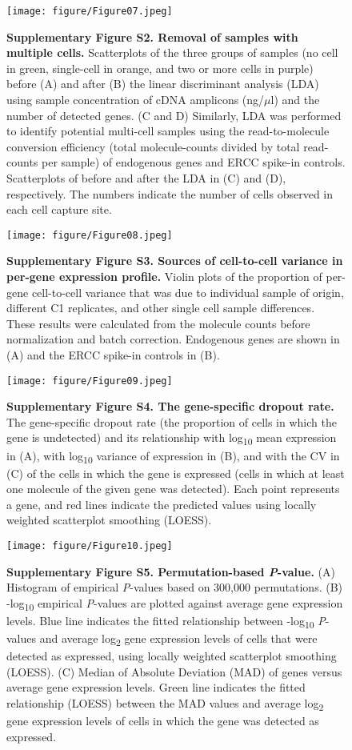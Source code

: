 \begin{figure}[htbp]
\centering
\texttt{[image: figure/Figure07.jpeg]}
\caption{\textbf{Supplementary Figure S2. Removal of samples with
multiple cells.} Scatterplots of the three groups of samples (no cell in
green, single-cell in orange, and two or more cells in purple) before
(A) and after (B) the linear discriminant analysis (LDA) using sample
concentration of cDNA amplicons (ng/$\mu$l) and the number of detected
genes. (C and D) Similarly, LDA was performed to identify potential
multi-cell samples using the read-to-molecule conversion efficiency
(total molecule-counts divided by total read-counts per sample) of
endogenous genes and ERCC spike-in controls. Scatterplots of before and
after the LDA in (C) and (D), respectively. The numbers indicate the
number of cells observed in each cell capture site.}
\end{figure}

\begin{figure}[htbp]
\centering
\texttt{[image: figure/Figure08.jpeg]}
\caption{\textbf{Supplementary Figure S3. Sources of cell-to-cell
variance in per-gene expression profile.} Violin plots of the proportion
of per-gene cell-to-cell variance that was due to individual sample of
origin, different C1 replicates, and other single cell sample
differences. These results were calculated from the molecule counts
before normalization and batch correction. Endogenous genes are shown in
(A) and the ERCC spike-in controls in (B).}
\end{figure}

\begin{figure}[htbp]
\centering
\texttt{[image: figure/Figure09.jpeg]}
\caption{\textbf{Supplementary Figure S4. The gene-specific dropout
rate.} The gene-specific dropout rate (the proportion of cells in which
the gene is undetected) and its relationship with log\textsubscript{10}
mean expression in (A), with log\textsubscript{10} variance of
expression in (B), and with the CV in (C) of the cells in which the gene
is expressed (cells in which at least one molecule of the given gene was
detected). Each point represents a gene, and red lines indicate the
predicted values using locally weighted scatterplot smoothing (LOESS).}
\end{figure}

\begin{figure}[htbp]
\centering
\texttt{[image: figure/Figure10.jpeg]}
\caption{\textbf{Supplementary Figure S5. Permutation-based
\emph{P}-value.} (A) Histogram of empirical \emph{P}-values based on
300,000 permutations. (B) -log\textsubscript{10} empirical
\emph{P}-values are plotted against average gene expression levels. Blue
line indicates the fitted relationship between -log\textsubscript{10}
\emph{P}-values and average log\textsubscript{2} gene expression levels
of cells that were detected as expressed, using locally weighted
scatterplot smoothing (LOESS). (C) Median of Absolute Deviation (MAD) of
genes versus average gene expression levels. Green line indicates the
fitted relationship (LOESS) between the MAD values and average
log\textsubscript{2} gene expression levels of cells in which the gene
was detected as expressed.}
\end{figure}

